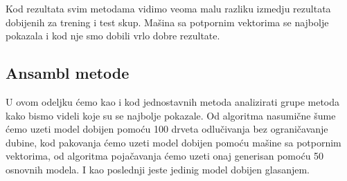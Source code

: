 \documentclass[a4paper]{article}
\begin{document}
Kod rezultata svim metodama vidimo veoma malu razliku izmedju rezultata dobijenih za trening i test skup. Mašina sa potpornim vektorima se najbolje pokazala i kod nje smo dobili vrlo dobre rezultate.

\subsection{Ansambl metode}
U ovom odeljku ćemo kao i kod jednostavnih metoda analizirati grupe metoda kako bismo videli koje su se najbolje pokazale. Od algoritma nasumične šume ćemo uzeti model dobijen pomoću 100 drveta odlučivanja bez ograničavanje dubine, kod pakovanja ćemo uzeti model dobijen pomoću mašine sa potpornim vektorima, od algoritma pojačavanja ćemo uzeti onaj generisan pomoću 50 osnovnih modela.  I kao poslednji jeste jedinig model dobijen glasanjem. 
\end{document}
